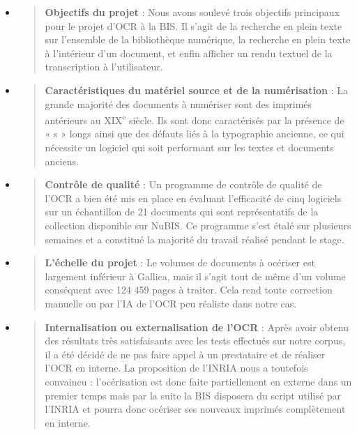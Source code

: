\documentclass[a4paper,12pt,twoside]{book}
\begin{document}
\begin{itemize}
	\item
	\begin{quote}
		\textbf{Objectifs du projet} : Nous avons soulevé trois objectifs principaux pour le projet d'OCR à la BIS. Il s'agit de la recherche en plein texte sur l'ensemble de la bibliothèque numérique, la recherche en plein texte à l'intérieur d'un document, et enfin afficher un rendu textuel de la transcription à l'utilisateur.
	\end{quote}
	\item
	\begin{quote}
		\textbf{Caractéristiques du matériel source et de la numérisation} :
		La grande majorité des documents à numériser sont des imprimés antérieurs au XIX\textsuperscript{e} siècle. Ils sont donc caractérisés par la présence de « s » longs ainsi que des défauts liés à la typographie ancienne, ce qui nécessite un logiciel qui soit performant sur les textes et documents anciens.
	\end{quote}
	\item
	\begin{quote}
		\textbf{Contrôle de qualité} : Un programme de contrôle de qualité de
		l'OCR a bien été mis en place en évaluant l'efficacité de cinq logiciels sur un échantillon de 21 documents qui sont représentatifs de la collection disponible sur NuBIS. Ce programme s'est étalé sur plusieurs semaines et a constitué la majorité du travail réalisé pendant le stage. 
	\end{quote}
	\item
	\begin{quote}
		\textbf{L'échelle du projet} : Le volumes de documents à océriser est largement inférieur à Gallica, mais il s'agit tout de même d'un volume conséquent avec 124 459 pages à traiter. Cela rend toute correction manuelle ou par l'IA de l'OCR peu réaliste dans notre cas. 
	\end{quote}
	\item
	\begin{quote}
		\textbf{Internalisation ou externalisation de l'OCR} :
		Après avoir obtenu des résultats très satisfaisants avec les tests effectués sur notre corpus, il a été décidé de ne pas faire appel à un prestataire et de réaliser l'OCR en interne. La proposition de l'INRIA nous a toutefois convaincu : l'océrisation est donc faite partiellement en externe dans un premier temps mais par la suite la BIS disposera du script utilisé par l'INRIA et pourra donc océriser ses nouveaux imprimés complètement en interne.

\end{quote}
\end{itemize}
\end{document}
